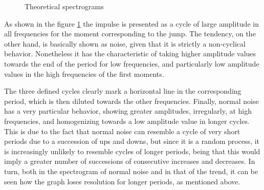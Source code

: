 \documentclass[a4paper]{article}
\begin{document}
\begin{figure}[H]
	    \vspace{0.00mm}
	    \vspace{0.00mm}
	\caption{Theoretical spectrograms} \label{fig:espect_teo}
\end{figure}

As shown in the figure \ref{fig:espect_teo} the impulse is presented as a cycle of large amplitude in all frequencies for the moment corresponding to the jump. The tendency, on the other hand, is basically shown as noise, given that it is strictly a non-cyclical behavior. Nonetheless it has the characteristic of taking higher amplitude values towards the end of the period for low frequencies, and particularly low amplitude values in the high frequencies of the first moments.

The three defined cycles clearly mark a horizontal line in the corresponding period, which is then diluted towards the other frequencies. Finally, normal noise has a very particular behavior, showing greater amplitudes, irregularly, at high frequencies, and homogenizing towards a low amplitude value in longer cycles. This is due to the fact that normal noise can resemble a cycle of very short periods due to a succession of ups and downs, but since it is a random process, it is increasingly unlikely to resemble cycles of longer periods, being that this would imply a greater number of successions of consecutive increases and decreases. In turn, both in the spectrogram of normal noise and in that of the trend, it can be seen how the graph loses resolution for longer periods, as mentioned above.
\end{document}
